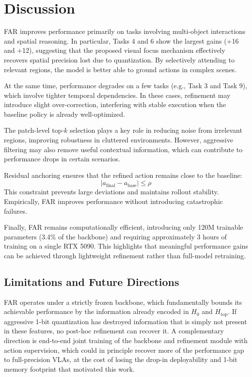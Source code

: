 \documentclass[conference]{IEEEtran}
\begin{document}
\section{Discussion}

FAR improves performance primarily on tasks involving multi-object interactions and spatial reasoning. In particular, Tasks 4 and 6 show the largest gains (+16 and +12), suggesting that the proposed visual focus mechanism effectively recovers spatial precision lost due to quantization. By selectively attending to relevant regions, the model is better able to ground actions in complex scenes.

At the same time, performance degrades on a few tasks (e.g., Task 3 and Task 9), which involve tighter temporal dependencies. In these cases, refinement may introduce slight over-correction, interfering with stable execution when the baseline policy is already well-optimized.

The patch-level top-$k$ selection plays a key role in reducing noise from irrelevant regions, improving robustness in cluttered environments. However, aggressive filtering may also remove useful contextual information, which can contribute to performance drops in certain scenarios.

Residual anchoring ensures that the refined action remains close to the baseline:
\begin{equation}
|a_{\text{final}} - a_{\text{base}}| \le \rho
\end{equation}
This constraint prevents large deviations and maintains rollout stability. Empirically, FAR improves performance without introducing catastrophic failures.

Finally, FAR remains computationally efficient, introducing only 120M trainable parameters (3.4\% of the backbone) and requiring approximately 3 hours of training on a single RTX 5090. This highlights that meaningful performance gains can be achieved through lightweight refinement rather than full-model retraining.

\subsection{Limitations and Future Directions}
FAR operates under a strictly frozen backbone, which fundamentally bounds its achievable performance by the information already encoded in $H_0$ and $H_{\text{top}}$. If aggressive 1-bit quantization has destroyed information that is simply not present in these features, no post-hoc refinement can recover it. A complementary direction is end-to-end joint training of the backbone and refinement module with action supervision, which could in principle recover more of the performance gap to full-precision VLAs, at the cost of losing the drop-in deployability and 1-bit memory footprint that motivated this work.
\end{document}
